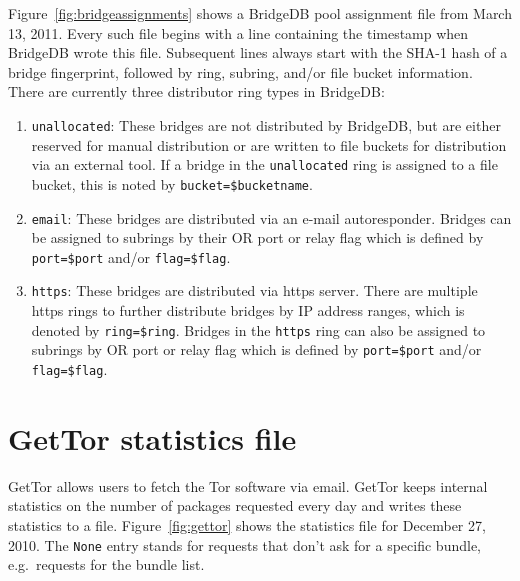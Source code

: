 \documentclass{article}
\begin{document}
Figure~\ref{fig:bridgeassignments} shows a BridgeDB pool assignment file
from March 13, 2011.
Every such file begins with a line containing the timestamp when BridgeDB
wrote this file.
Subsequent lines always start with the SHA-1 hash of a bridge fingerprint,
followed by ring, subring, and/or file bucket information.
There are currently three distributor ring types in BridgeDB:

\begin{enumerate}
\item \texttt{unallocated}: These bridges are not distributed by BridgeDB,
but are either reserved for manual distribution or are written to file
buckets for distribution via an external tool.
If a bridge in the \texttt{unallocated} ring is assigned to a file bucket,
this is noted by \verb+bucket=$bucketname+.
\item \texttt{email}: These bridges are distributed via an e-mail
autoresponder.  Bridges can be assigned to subrings by their OR port or
relay flag which is defined by \verb+port=$port+ and/or \verb+flag=$flag+.
\item \texttt{https}: These bridges are distributed via https server.
There are multiple https rings to further distribute bridges by IP address
ranges, which is denoted by \verb+ring=$ring+.
Bridges in the \texttt{https} ring can also be assigned to subrings by
OR port or relay flag which is defined by \verb+port=$port+ and/or
\verb+flag=$flag+.
\end{enumerate}

\section{GetTor statistics file}

GetTor allows users to fetch the Tor software via email.
GetTor keeps internal statistics on the number of packages requested
every day and writes these statistics to a file.
Figure~\ref{fig:gettor} shows the statistics file for December 27, 2010.
The \verb+None+ entry stands for requests that don't ask for a specific
bundle, e.g.\ requests for the bundle list.
\end{document}
